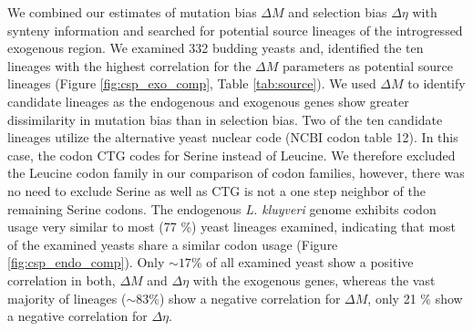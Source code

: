 \documentclass{bmcart}
\newcommand{\kluyveri}{\textit{L. kluyveri}\xspace}
\newcommand{\DM}{\ensuremath{{\Delta M}}\xspace}
\newcommand{\DE}{\ensuremath{{\Delta \eta}}\xspace}
\begin{document}
We combined our estimates of mutation bias \DM and selection bias \DE with synteny information and searched for potential source lineages of the introgressed exogenous region.
We examined 332 budding yeasts \citep{shen2018} and, identified the ten lineages with the highest correlation for the \DM parameters as potential source lineages (Figure \ref{fig:csp_exo_comp}, Table \ref{tab:source}).
We used \DM to identify candidate lineages as the endogenous and exogenous genes show greater dissimilarity in mutation bias than in selection bias.
Two of the ten candidate lineages utilize the alternative yeast nuclear code (NCBI codon table 12). 
In this case, the codon CTG codes for Serine instead of Leucine. 
We therefore excluded the Leucine codon family in our comparison of codon families, however, there was no need to exclude Serine as well as CTG is not a one step neighbor of the remaining Serine codons.
The endogenous \kluyveri genome exhibits codon usage very similar to most (77 \%) yeast lineages examined, indicating that most of the examined yeasts share a similar codon usage (Figure \ref{fig:csp_endo_comp}).
Only $\sim 17 \%$ of all examined yeast show a positive correlation in both, \DM and \DE with the exogenous genes, whereas the vast majority of lineages ($\sim 83 \%$) show a negative correlation for \DM, only 21 \% show a negative correlation for \DE.
\end{document}
